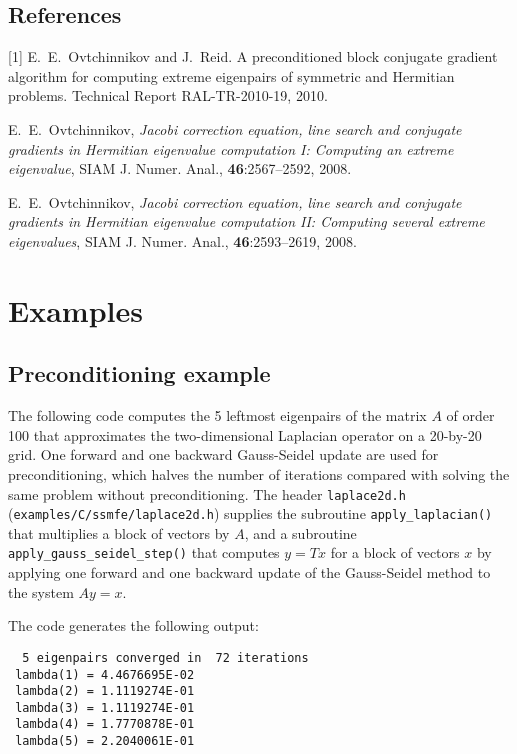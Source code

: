 \subsection*{References}

[1]
E.~E.~Ovtchinnikov and J.~Reid.
A preconditioned block conjugate gradient
algorithm for computing extreme eigenpairs
of symmetric and Hermitian problems.
Technical Report RAL-TR-2010-19, 2010.

\noindent
[2]
E.~E.~Ovtchinnikov,
{\em Jacobi correction equation, line search and
conjugate gradients in Hermitian eigenvalue computation I:
Computing an extreme eigenvalue},
SIAM J. Numer. Anal., {\bf 46}:2567--2592, 2008.

\noindent
[3]
E.~E.~Ovtchinnikov,
{\em Jacobi correction equation, line search and
conjugate gradients in Hermitian eigenvalue computation II:
Computing several extreme eigenvalues},
SIAM J. Numer. Anal., {\bf 46}:2593--2619, 2008.

\section{Examples}

\subsection{Preconditioning example}

The following code 
computes the 5 leftmost eigenpairs of 
the matrix $A$ of order 100 that approximates 
the two-dimensional Laplacian operator
on a 20-by-20 grid.
One forward and one backward Gauss-Seidel update
are used for preconditioning,
which halves the number of iterations
compared with solving the same problem without preconditioning.
The header {\tt laplace2d.h} (\texttt{examples/C/ssmfe/laplace2d.h})
supplies the subroutine {\tt apply\_laplacian()}
that multiplies a block of vectors by $A$,
and a subroutine 
{\tt apply\_gauss\_seidel\_step()}
that computes $y = T x$ for a block of vectors $x$
by applying one forward and one backward update
of the Gauss-Seidel method to the system $A y = x$.

The code generates the following output:
\begin{verbatim}
  5 eigenpairs converged in  72 iterations
 lambda(1) = 4.4676695E-02
 lambda(2) = 1.1119274E-01
 lambda(3) = 1.1119274E-01
 lambda(4) = 1.7770878E-01
 lambda(5) = 2.2040061E-01
\end{verbatim}
